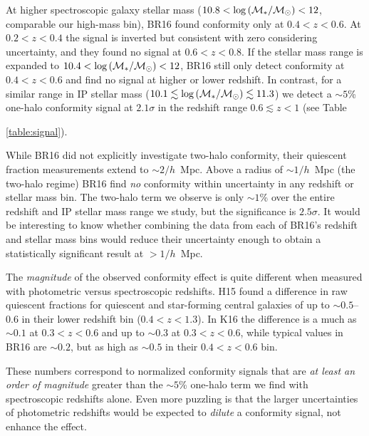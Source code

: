 At higher spectroscopic galaxy stellar mass (${10.8 < \logM < 12}$, comparable our high-mass bin), BR16 found conformity only at ${0.4<z<0.6}$.
At ${0.2<z<0.4}$ the signal is inverted but consistent with zero considering uncertainty, and they found no signal at ${0.6<z<0.8}$.
If the stellar mass range is expanded to ${10.4 < \logM < 12}$, BR16 still only detect conformity at ${0.4<z<0.6}$ and find no signal at higher or lower redshift.
In contrast, for a similar range in IP stellar mass (${10.1\lesssim \logM \lesssim11.3}$) we detect a $\sim5$\% one-halo conformity signal at $2.1\sigma$ in the redshift range ${0.6\lesssim z<1}$ (see Table~{\ref{table:signal}).

While BR16 did not explicitly investigate two-halo conformity, their quiescent fraction measurements extend to $\sim2/h$~Mpc.
Above a radius of $\sim1/h$~Mpc (the two-halo regime) BR16 find \emph{no} conformity within uncertainty in any redshift or stellar mass bin.
The two-halo term we observe is only $\sim1$\% over the entire redshift and IP stellar mass range we study, but the significance is $2.5\sigma$.
It would be interesting to know whether combining the data from each of BR16's redshift and stellar mass bins would reduce their uncertainty enough to obtain a statistically significant result at $>1/h$~Mpc.


The \emph{magnitude} of the observed conformity effect is quite different when measured with photometric versus spectroscopic redshifts.
H15 found a difference in raw quiescent fractions for quiescent and star-forming central galaxies of up to $\sim0.5$--0.6 in their lower redshift bin ($0.4<z<1.3$).
In K16 the difference is a much as $\sim0.1$ at ${0.3<z<0.6}$ and up to $\sim0.3$ at ${0.3<z<0.6}$, while typical values in BR16 are $\sim0.2$, but as high as $\sim0.5$ in their ${0.4<z<0.6}$ bin.

These numbers correspond to normalized conformity signals that are \emph{at least an order of magnitude} greater than the $\sim5$\% one-halo term we find with spectroscopic redshifts alone.
Even more puzzling is that the larger uncertainties of photometric redshifts would be expected to \emph{dilute} a conformity signal, not enhance the effect. 

}
